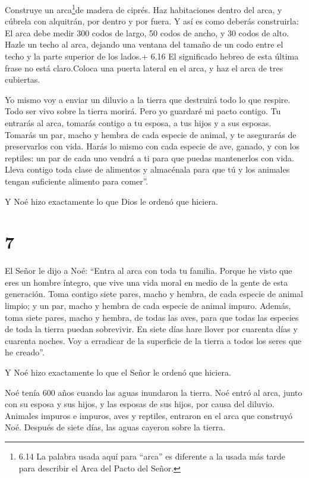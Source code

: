  Construye un arca\footnote{6.14 La palabra usada aquí para
  ``arca'' es diferente a la usada más tarde para describir el Arca del
  Pacto del Señor.}de madera de ciprés. Haz habitaciones dentro del
arca, y cúbrela con alquitrán, por dentro y por fuera.  Y
así es como deberás construirla: El arca debe medir 300 codos de largo,
50 codos de ancho, y 30 codos de alto.  Hazle un techo al
arca, dejando una ventana del tamaño de un codo entre el techo y la
parte superior de los lados.+ 6.16 El significado hebreo de esta última
frase no está claro.Coloca una puerta lateral en el arca, y haz el arca
de tres cubiertas.

 Yo mismo voy a enviar un diluvio a la tierra que destruirá
todo lo que respire. Todo ser vivo sobre la tierra morirá. 
Pero yo guardaré mi pacto contigo. Tu entrarás al arca, tomarás contigo
a tu esposa, a tus hijos y a sus esposas.  Tomarás un par,
macho y hembra de cada especie de animal, y te asegurarás de
preservarlos con vida.  Harás lo mismo con cada especie de
ave, ganado, y con los reptiles: un par de cada uno vendrá a ti para que
puedas mantenerlos con vida.  Lleva contigo toda clase de
alimentos y almacénala para que tú y los animales tengan suficiente
alimento para comer''.

 Y Noé hizo exactamente lo que Dios le ordenó que hiciera.

\hypertarget{section-6}{%
\section{7}\label{section-6}}

 El Señor le dijo a Noé: ``Entra al arca con toda tu
familia. Porque he visto que eres un hombre íntegro, que vive una vida
moral en medio de la gente de esta generación.  Toma contigo
siete pares, macho y hembra, de cada especie de animal limpio; y un par,
macho y hembra de cada especie de animal impuro.  Además,
toma siete pares, macho y hembra, de todas las aves, para que todas las
especies de toda la tierra puedan sobrevivir.  En siete días
hare llover por cuarenta días y cuarenta noches. Voy a erradicar de la
superficie de la tierra a todos los seres que he creado''.

 Y Noé hizo exactamente lo que el Señor le ordenó que
hiciera.

 Noé tenía 600 años cuando las aguas inundaron la tierra.
 Noé entró al arca, junto con su esposa y sus hijos, y las
esposas de sus hijos, por causa del diluvio.  Animales
impuros e impuros, aves y reptiles,  entraron en el arca que
construyó Noé.  Después de siete días, las aguas cayeron
sobre la tierra.

